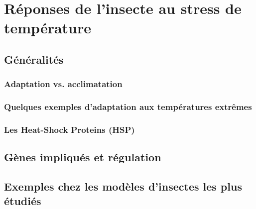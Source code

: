 \chapter{Réponses de l’insecte au stress de température} %
\label{chap:repstress}
	
	\section{Généralités} %
	\label{sec:g_n_ralit_s}
		

		\subsection{Adaptation vs. acclimatation} %
		\label{sub:adaptation_vs_accilmatation}
			

		\subsection{Quelques exemples d'adaptation aux températures extrêmes} %
		\label{sub:exemples_adaptations}
			

		\subsection{Les Heat-Shock Proteins (HSP)} %
		\label{sub:generalites_HSP}
					

	\section{Gènes impliqués et régulation} %
	\label{sec:genes}
		

	\section{Exemples chez les modèles d'insectes les plus étudiés} %
	\label{sec:exemples_modeles}
		

